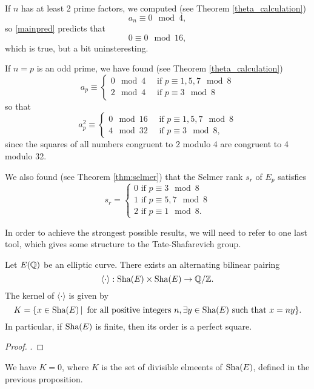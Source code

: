 \documentclass[12pt, a4paper]{report}
\begin{document}
If $n$ has at least 2 prime factors, we computed (see Theorem \autoref{theta_calculation})
\[a_n \equiv 0 \mod{4},\]
so \autoref{mainpred} predicts that
\[0 \equiv 0 \mod{16},\]
which is true, but a bit uninsteresting.

If $n = p$ is an odd prime, we have found (see Theorem \autoref{theta_calculation})
\[a_p \equiv \begin{cases}
    0 \mod{4} \quad \text{ if } p \equiv 1,5,7 \mod{8} \\
    2 \mod{4} \quad \text{ if } p \equiv 3 \mod{8}
  \end{cases}
\]
so that
\[a_p^2 \equiv
  \begin{cases}
    0 \mod{16} \quad \text{ if } p \equiv 1,5,7 \mod{8} \\
    4 \mod {32} \quad \text{ if } p \equiv 3 \mod{8},
  \end{cases}
\]
since the squares of all numbers congruent to 2 modulo 4 are congruent to 4
modulo 32.

We also found (see Theorem \autoref{thm:selmer}) that the Selmer rank $s_r$ of
$E_p$ satisfies
\begin{equation*}
  s_r =
  \begin{cases}
    0 \text{ if } p \equiv 3 \mod{8} \\
    1 \text{ if } p \equiv 5,7 \mod{8} \\
    2 \text{ if } p \equiv 1 \mod{8}.
  \end{cases}
\end{equation*}

In order to achieve the strongest possible results, we will need to refer to one
last tool, which gives some structure to the Tate-Shafarevich group.
\begin{prop}
  Let $E({\mathbb Q})$ be an elliptic curve. There exists an alternating bilinear
  pairing
  \[\langle \cdot \rangle : \text{\normalfont Sha}(E) \times \text{\normalfont Sha}(E) \rightarrow {\mathbb Q} / {\mathbb Z}.\]
  The kernel of $\langle \cdot \rangle$ is given by 
  \[K = \{ x \in \text{\normalfont Sha}(E) \, | \, \textnormal{ for all positive integers } n, 
    \exists y \in \text{\normalfont Sha}(E) \textnormal{ such that } x = ny\}.\]
  In particular, if $\text{\normalfont Sha}(E)$ is finite, then its order is a perfect square. 
\end{prop}

\begin{proof}
  \cite[See][]{Cassels}.
\end{proof}

\begin{conj} \label{cassels_conj}
  We have $K = 0$, where $K$ is the set of divisible elmeents of $\text{\normalfont Sha}(E)$,
  defined in the previous proposition.
\end{conj}
\end{document}
